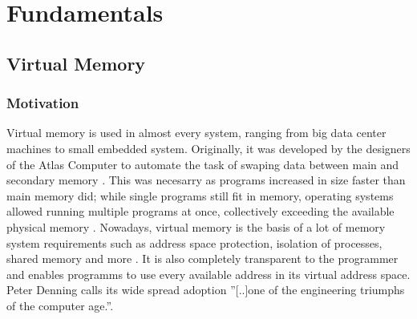 \chapter{Fundamentals} %
\label{chap:fund}

%





\section{Virtual Memory}
\subsection{Motivation}
Virtual memory is used in almost every system, ranging from big data center machines to small embedded system.
Originally, it was developed by the designers of the Atlas Computer to automate the task of swaping data between
main and secondary memory \cite{denning1997before}.
This was necesarry as programs increased in size faster than main memory did; while single programs
still fit in memory, operating systems allowed running multiple programs at once, collectively exceeding
the available physical memory \cite{tanenbaumOS}.
Nowadays, virtual memory is the basis of a lot of memory system requirements such as address
space protection, isolation of processes, shared memory and more \cite{jacobSoftwaremanagedAddressTranslation1997}.
It is also completely transparent to the programmer and enables programms to use every available
address in its virtual address space.\\
Peter Denning calls its wide spread adoption ''[..]one of the engineering triumphs of the computer
age.''\cite{denning1997before}.
